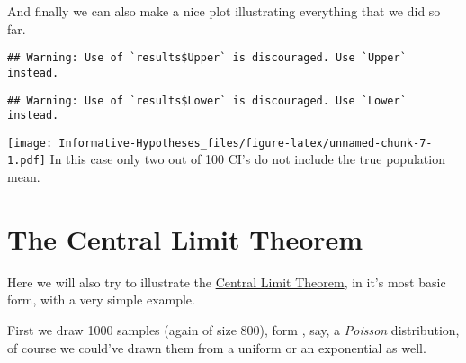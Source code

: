 \documentclass[
]{book}
\newenvironment{Shaded}{\begin{snugshade}}{\end{snugshade}}
\newcommand{\CommentTok}[1]{\textcolor[rgb]{0.56,0.35,0.01}{\textit{#1}}}
\newcommand{\DataTypeTok}[1]{\textcolor[rgb]{0.13,0.29,0.53}{#1}}
\newcommand{\DecValTok}[1]{\textcolor[rgb]{0.00,0.00,0.81}{#1}}
\newcommand{\KeywordTok}[1]{\textcolor[rgb]{0.13,0.29,0.53}{\textbf{#1}}}
\newcommand{\NormalTok}[1]{#1}
\newcommand{\OperatorTok}[1]{\textcolor[rgb]{0.81,0.36,0.00}{\textbf{#1}}}
\newcommand{\StringTok}[1]{\textcolor[rgb]{0.31,0.60,0.02}{#1}}
\begin{document}
And finally we can also make a nice plot illustrating everything that we did so far.

\begin{Shaded}
\end{Shaded}

\begin{verbatim}
## Warning: Use of `results$Upper` is discouraged. Use `Upper` instead.
\end{verbatim}

\begin{verbatim}
## Warning: Use of `results$Lower` is discouraged. Use `Lower` instead.
\end{verbatim}

\texttt{[image: Informative-Hypotheses\_files/figure-latex/unnamed-chunk-7-1.pdf]}
In this case only two out of 100 CI's do not include the true population mean.

\hypertarget{the-central-limit-theorem}{%
\section{The Central Limit Theorem}\label{the-central-limit-theorem}}

Here we will also try to illustrate the \href{https://en.wikipedia.org/wiki/Central_limit_theorem}{Central Limit Theorem}, in it's most basic form, with a very simple example.

First we draw 1000 samples (again of size 800), form , say, a \emph{Poisson} distribution, of course we could've drawn them from a uniform or an exponential as well.
\end{document}
